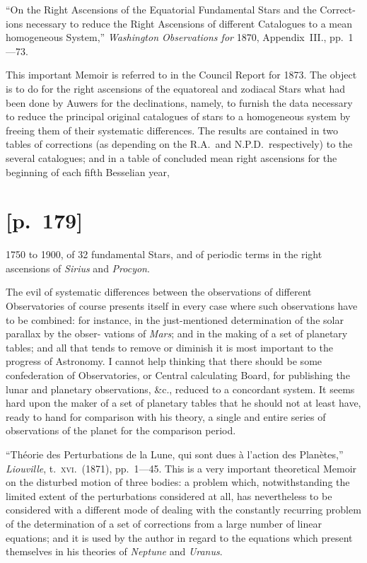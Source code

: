 \documentclass[11pt]{article}
\begin{document}
\medskip
\noindent``On the Right Ascensions of the Equatorial Fundamental Stars and the Correct-
ions necessary to reduce the Right Ascensions of different Catalogues to a mean
homogeneous System,'' \textit{Washington Observations for} 1870, Appendix~III., pp.~1---73.

This important Memoir is referred to in the Council Report for 1873. The object
is to do for the right ascensions of the equatoreal and zodiacal Stars what had been
done by Auwers for the declinations, namely, to furnish the data necessary to reduce
the principal original catalogues of stars to a homogeneous system by freeing them of
their systematic differences. The results are contained in two tables of corrections (as
depending on the R.A.\ and N.P.D.\ respectively) to the several catalogues; and in a
table of concluded mean right ascensions for the beginning of each fifth Besselian year,

\section*{[p.~179]}
1750 to 1900, of 32 fundamental Stars, and of periodic terms in the right ascensions
of \textit{Sirius} and \textit{Procyon}.

The evil of systematic differences between the observations of different Observatories
of course presents itself in every case where such observations have to be combined:
for instance, in the just-mentioned determination of the solar parallax by the obser-
vations of \textit{Mars}; and in the making of a set of planetary tables; and all that tends
to remove or diminish it is most important to the progress of Astronomy. I cannot
help thinking that there should be some confederation of Observatories, or Central
calculating Board, for publishing the lunar and planetary observations, \&c., reduced to
a concordant system. It seems hard upon the maker of a set of planetary tables that
he should not at least have, ready to hand for comparison with his theory, a single
and entire series of observations of the planet for the comparison period.

\medskip
\noindent``Th\'eorie des Perturbations de la Lune, qui sont dues \`a l'action des Plan\`etes,''
\textit{Liouville}, t.~\textsc{xvi}.\ (1871), pp.~1---45. This is a very important theoretical Memoir on the
disturbed motion of three bodies: a problem which, notwithstanding the limited extent
of the perturbations considered at all, has nevertheless to be considered with a different
mode of dealing with the constantly recurring problem of the determination of a set
of corrections from a large number of linear equations; and it is used by the author
in regard to the equations which present themselves in his theories of \textit{Neptune} and
\textit{Uranus}.
\end{document}
